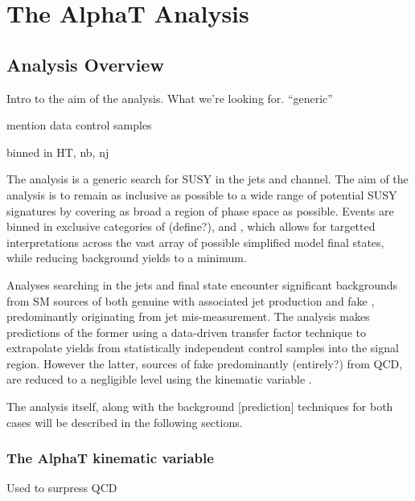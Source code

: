 \chapter{The AlphaT Analysis}

\ifpdf
    \graphicspath{{Chapter5/Figs/Raster/}{Chapter5/Figs/PDF/}{Chapter5/Figs/}}
\else
    \graphicspath{{Chapter5/Figs/Vector/}{Chapter5/Figs/}}
\fi


\section{Analysis Overview}  %
\label{sec:selection_analysis_overview}

Intro to the aim of the analysis. What we're looking for. ``generic''

mention data control samples

binned in HT, nb, nj


The \alphat analysis is a generic search for SUSY in the jets and 
\met channel. The aim of the analysis is to remain as inclusive as possible to a
wide range of potential SUSY signatures by covering as broad a region of phase 
space as possible. Events are binned in exclusive categories of \HT (define?), 
\nj and \nb, which allows for targetted interpretations across the vast array of
possible simplified model final states, while reducing background yields to a 
minimum.

Analyses searching in the jets and \met final state encounter significant 
backgrounds from SM sources of both genuine \met with associated jet production 
and fake \met, predominantly originating from jet mis-measurement. The \alphat 
analysis makes predictions of the former using a data-driven transfer factor 
technique to extrapolate yields from statistically independent control samples 
into the signal region. However the latter, sources of fake \met predominantly 
(entirely?) from QCD, are reduced to a negligible level using the kinematic 
variable \alphat.

The analysis itself, along with the background [prediction] techniques for both 
cases will be described in the following sections.


\subsection{The AlphaT kinematic variable}
Used to surpress QCD


